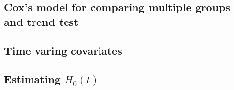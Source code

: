 \documentclass[a4paper,12pt]{article}
\begin{document}
\subsection{Cox's model for comparing multiple groups and trend test}
\label{sec:coxs-model-comparing}

\subsection{Time varing covariates}
\label{sec:time-varing-covar}

\subsection{Estimating $H_0\left(t\right)$}
\label{sec:estim-h_0l}








\end{document}
